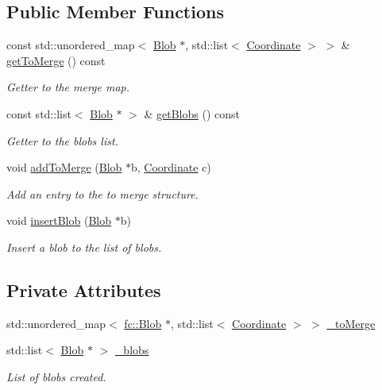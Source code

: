 \subsection*{Public Member Functions}
\begin{DoxyCompactItemize}
\item 
const std\+::unordered\+\_\+map$<$ \hyperlink{classfc_1_1Blob}{Blob} $\ast$, std\+::list$<$ \hyperlink{namespacefc_a7da125cb1e99553c27c07139ee8a62ca}{Coordinate} $>$ $>$ \& \hyperlink{classfc_1_1ViewAnalyse_a67f51d5e398dd7ebd193c60d7702cb6d}{get\+To\+Merge} () const
\begin{DoxyCompactList}\small\item\em Getter to the merge map. \end{DoxyCompactList}\item 
const std\+::list$<$ \hyperlink{classfc_1_1Blob}{Blob} $\ast$ $>$ \& \hyperlink{classfc_1_1ViewAnalyse_a8c17dd40de33f16768c9733e978b7f12}{get\+Blobs} () const
\begin{DoxyCompactList}\small\item\em Getter to the blobs list. \end{DoxyCompactList}\item 
void \hyperlink{classfc_1_1ViewAnalyse_ab1138c97855a370559dd6df6521529c7}{add\+To\+Merge} (\hyperlink{classfc_1_1Blob}{Blob} $\ast$b, \hyperlink{namespacefc_a7da125cb1e99553c27c07139ee8a62ca}{Coordinate} c)
\begin{DoxyCompactList}\small\item\em Add an entry to the to merge structure. \end{DoxyCompactList}\item 
void \hyperlink{classfc_1_1ViewAnalyse_a3e319a372ebecb594a2d728a110f1be5}{insert\+Blob} (\hyperlink{classfc_1_1Blob}{Blob} $\ast$b)
\begin{DoxyCompactList}\small\item\em Insert a blob to the list of blobs. \end{DoxyCompactList}\end{DoxyCompactItemize}
\subsection*{Private Attributes}
\begin{DoxyCompactItemize}
\item 
std\+::unordered\+\_\+map$<$ \hyperlink{classfc_1_1Blob}{fc\+::\+Blob} $\ast$, std\+::list$<$ \hyperlink{namespacefc_a7da125cb1e99553c27c07139ee8a62ca}{Coordinate} $>$ $>$ \hyperlink{classfc_1_1ViewAnalyse_a426904a0e69addc711b90dbd288c0a00}{\+\_\+to\+Merge}
\item 
std\+::list$<$ \hyperlink{classfc_1_1Blob}{Blob} $\ast$ $>$ \hyperlink{classfc_1_1ViewAnalyse_a209772ce7d1b046c21eaaf3e13cbb4d5}{\+\_\+blobs}
\begin{DoxyCompactList}\small\item\em List of blobs created. \end{DoxyCompactList}\end{DoxyCompactItemize}


